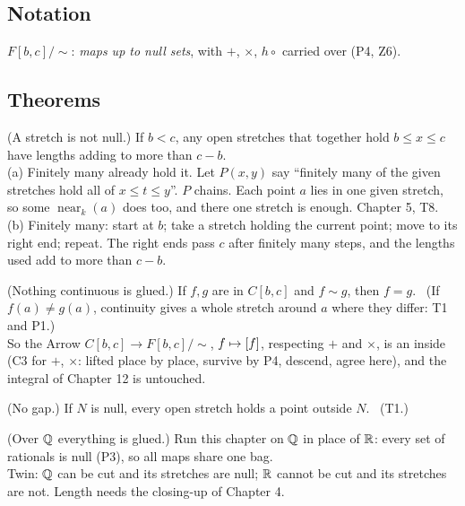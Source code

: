 \subsection*{Notation}

\begin{lines}
\item[\lab{N1}] $F[b,c]/{\sim}$: \emph{maps up to null sets}, with $+$, $\times$, $h \circ$ carried over (P4, Z6).
\end{lines}

\subsection*{Theorems}

\begin{lines}
\item[\lab{T1}] (A stretch is not null.) If $b < c$, any open stretches that together hold $b \le x \le c$ have lengths adding to more than $c - b$. \\
(a) Finitely many already hold it. Let $P(x, y)$ say ``finitely many of the given stretches hold all of $x \le t \le y$''. $P$ chains. Each point $a$ lies in one given stretch, so some $\operatorname{near}_k(a)$ does too, and there one stretch is enough. Chapter 5, T8. \\
(b) Finitely many: start at $b$; take a stretch holding the current point; move to its right end; repeat. The right ends pass $c$ after finitely many steps, and the lengths used add to more than $c - b$.
\item[\lab{T2}] (Nothing continuous is glued.) If $f, g$ are in $C[b,c]$ and $f \sim g$, then $f = g$. \ (If $f(a) \ne g(a)$, continuity gives a whole stretch around $a$ where they differ: T1 and P1.) \\
So the Arrow $C[b,c] \to F[b,c]/{\sim}$, $f \mapsto [f]$, respecting $+$ and $\times$, is an inside (C3 for $+$, $\times$: lifted place by place, survive by P4, descend, agree here), and the integral of Chapter 12 is untouched.
\item[\lab{T3}] (No gap.) If $N$ is null, every open stretch holds a point outside $N$. \ (T1.)
\item[\lab{T4}] (Over $\mathbb{Q}$ everything is glued.) Run this chapter on $\mathbb{Q}$ in place of $\mathbb{R}$: every set of rationals is null (P3), so all maps share one bag. \\
Twin: $\mathbb{Q}$ can be cut and its stretches are null; $\mathbb{R}$ cannot be cut and its stretches are not. Length needs the closing-up of Chapter 4.
\end{lines}

